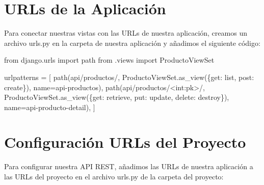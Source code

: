 \documentclass[
  a4paper,
  DIV=11,
  numbers=noendperiod,
  onepage,
  openany]{scrreprt}
\newenvironment{Shaded}{\begin{snugshade}}{\end{snugshade}}
\newcommand{\ImportTok}[1]{\textcolor[rgb]{0.00,0.46,0.62}{#1}}
\newcommand{\NormalTok}[1]{\textcolor[rgb]{0.00,0.23,0.31}{#1}}
\newcommand{\OperatorTok}[1]{\textcolor[rgb]{0.37,0.37,0.37}{#1}}
\newcommand{\StringTok}[1]{\textcolor[rgb]{0.13,0.47,0.30}{#1}}
\begin{document}
\section{URLs de la Aplicación}\label{urls-de-la-aplicaciuxf3n}

Para conectar nuestras vistas con las URLs de nuestra aplicación,
creamos un archivo urls.py en la carpeta de nuestra aplicación y
añadimos el siguiente código:

\begin{Shaded}
\begin{Highlighting}[]
\ImportTok{from}\NormalTok{ django.urls }\ImportTok{import}\NormalTok{ path}
\ImportTok{from}\NormalTok{ .views }\ImportTok{import}\NormalTok{ ProductoViewSet}

\NormalTok{urlpatterns }\OperatorTok{=}\NormalTok{ [}
\NormalTok{    path(}\StringTok{\textquotesingle{}api/productos/\textquotesingle{}}\NormalTok{, ProductoViewSet.as\_view(\{}\StringTok{\textquotesingle{}get\textquotesingle{}}\NormalTok{: }\StringTok{\textquotesingle{}list\textquotesingle{}}\NormalTok{, }\StringTok{\textquotesingle{}post\textquotesingle{}}\NormalTok{: }\StringTok{\textquotesingle{}create\textquotesingle{}}\NormalTok{\}), name}\OperatorTok{=}\StringTok{\textquotesingle{}api{-}productos\textquotesingle{}}\NormalTok{),}
\NormalTok{    path(}\StringTok{\textquotesingle{}api/productos/\textless{}int:pk\textgreater{}/\textquotesingle{}}\NormalTok{, ProductoViewSet.as\_view(\{}\StringTok{\textquotesingle{}get\textquotesingle{}}\NormalTok{: }\StringTok{\textquotesingle{}retrieve\textquotesingle{}}\NormalTok{, }\StringTok{\textquotesingle{}put\textquotesingle{}}\NormalTok{: }\StringTok{\textquotesingle{}update\textquotesingle{}}\NormalTok{, }\StringTok{\textquotesingle{}delete\textquotesingle{}}\NormalTok{: }\StringTok{\textquotesingle{}destroy\textquotesingle{}}\NormalTok{\}), name}\OperatorTok{=}\StringTok{\textquotesingle{}api{-}producto{-}detail\textquotesingle{}}\NormalTok{),}
\NormalTok{]}
\end{Highlighting}
\end{Shaded}

\section{Configuración URLs del
Proyecto}\label{configuraciuxf3n-urls-del-proyecto}

Para configurar nuestra API REST, añadimos las URLs de nuestra
aplicación a las URLs del proyecto en el archivo urls.py de la carpeta
del proyecto:
\end{document}
